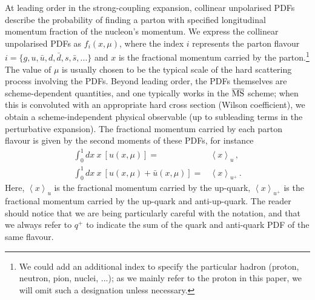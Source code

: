 At leading order in the strong-coupling expansion, 
collinear unpolarised PDFs describe the probability of finding a parton with specified longitudinal momentum fraction 
of the nucleon's momentum. 
We express the collinear unpolarised PDFs as $f_{i}(x,\mu)$,
where the index $i$ represents the parton flavour $i=\{g,u,\bar{u},d,\bar{d},s,\bar{s},...\}$ and
$x$ is the fractional momentum carried by the parton.\footnote{We could add an additional index to specify the particular hadron
(proton, neutron, pion, nuclei, ...); as we mainly refer to the proton
  in this paper, we will omit such a designation unless necessary.}
%
The value of $\mu$ is usually chosen to be the typical scale of the hard scattering
process involving the PDFs.
%
Beyond leading order, the PDFs themselves
are scheme-dependent quantities, and one typically works in
the $\overline{\rm MS}$ scheme; when this is convoluted with an appropriate
hard cross section (Wilson coefficient), we obtain a scheme-independent
physical observable (up to subleading terms in the perturbative expansion). 
%
The fractional momentum carried
by each parton flavour is given by the second moments of these PDFs, for instance
%
\begin{align}
\int_{0}^{1}dx\ x\ \left[u(x,\mu)\right] = & {}  \left\langle x\right\rangle _{u}\,, \label{eq:umoment1}\\
\int_{0}^{1}dx\ x\ \left[u(x,\mu)+\bar{u}(x,\mu)\right] = & {} \left\langle x\right\rangle _{u^{+}}\,. \label{eq:uplusmoment1}
\end{align}
%
Here, $\left\langle x\right\rangle _{u}$ is the fractional momentum
carried by the up-quark, $\left\langle x\right\rangle _{u^{+}}$ is
the fractional momentum carried by the up-quark and anti-up-quark.
%
The reader should notice that we are being particularly careful
with the notation, and that we always refer to $q^+$ to indicate
the sum of the quark and anti-quark PDF of the same flavour.


